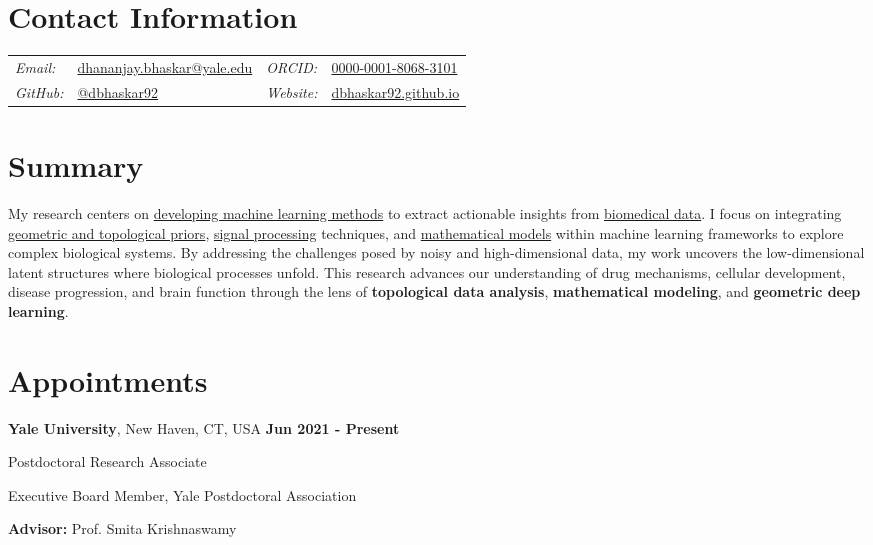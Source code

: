 \documentclass[margin,line]{res}
\newenvironment{list1}{
  \begin{list}{\ding{113}}{
      \setlength{\itemsep}{0in}
      \setlength{\parsep}{0in} \setlength{\parskip}{0in}
      \setlength{\topsep}{0in} \setlength{\partopsep}{0in}
      \setlength{\leftmargin}{0.17in}}}{\end{list}}
\begin{document}
\pagestyle{plain}


\begin{resume}

\vspace*{.2cm}

\section{\sc Contact Information}

\renewcommand{\arraystretch}{1.1}
\begin{tabular}{@{}p{1.8cm}p{6.3cm}p{2.1cm}p{4cm}}
{\it Email:} & \href{mailto:dhananjay.bhaskar@yale.edu}{dhananjay.bhaskar@yale.edu} & {\it ORCID:} & \href{https://orcid.org/0000-0001-8068-3101}{0000-0001-8068-3101} \\
{\it GitHub:} & \href{https://github.com/dbhaskar92}{@dbhaskar92} & {\it Website:} & \href{https://dbhaskar92.github.io/}{dbhaskar92.github.io}
\end{tabular}

\vspace*{.05cm}

\section{\sc Summary} My research centers on \ul{developing machine learning methods} to extract actionable insights from \ul{biomedical data}. I focus on integrating \ul{geometric and topological priors}, \ul{signal processing} techniques, and \ul{mathematical models} within machine learning frameworks to explore complex biological systems. By addressing the challenges posed by noisy and high-dimensional data, my work uncovers the low-dimensional latent structures where biological processes unfold. This research advances our understanding of drug mechanisms, cellular development, disease progression, and brain function through the lens of \textbf{topological data analysis}, \textbf{mathematical modeling}, and \textbf{geometric deep learning}.

\section{\sc Appointments}

{\bf Yale University}, New Haven, CT, USA  \hfill {\bf Jun 2021 - Present}\\
\vspace*{-.2cm}
\begin{list1}
\setlength\itemsep{0.22em}
\item[] Postdoctoral Research Associate
\item[] Executive Board Member, Yale Postdoctoral Association
\vspace*{.1cm}
\item[] {\bf Advisor:} Prof. Smita Krishnaswamy
\end{list1}


\end{resume}
\end{document}
